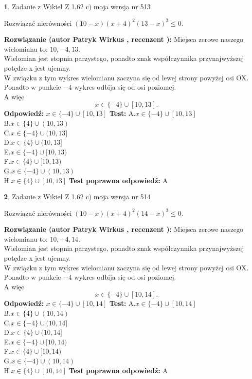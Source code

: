 \documentclass[12pt, a4paper]{article}
\theoremstyle{definition} %
\newtheorem{zad}{}
\newcommand{\zadStart}[1]{\begin{zad}#1\newline}
\newcommand{\zadStop}{\end{zad}}
\newcommand{\rozwStart}[2]{\noindent \textbf{Rozwiązanie (autor #1 , recenzent #2): }\newline}
\newcommand{\rozwStop}{\newline}
\newcommand{\odpStart}{\noindent \textbf{Odpowiedź:}\newline}
\newcommand{\odpStop}{\newline}
\newcommand{\testStart}{\noindent \textbf{Test:}\newline}
\newcommand{\testStop}{\newline}
\newcommand{\kluczStart}{\noindent \textbf{Test poprawna odpowiedź:}\newline}
\newcommand{\kluczStop}{\newline}
\begin{document}
\zadStart{Zadanie z Wikieł Z 1.62 c) moja wersja nr 513}

Rozwiązać nierówności $(10-x)(x+4)^{2}(13-x)^{3}\le0$.
\zadStop
\rozwStart{Patryk Wirkus}{}
Miejsca zerowe naszego wielomianu to: $10, -4, 13$.\\
Wielomian jest stopnia parzystego, ponadto znak współczynnika przy\linebreak najwyższej potędze x jest ujemny.\\ W związku z tym wykres wielomianu zaczyna się od lewej strony powyżej osi OX.\\
Ponadto w punkcie $-4$ wykres odbija się od osi poziomej.\\
A więc $$x \in \{-4\} \cup [10,13].$$
\rozwStop
\odpStart
$x \in \{-4\} \cup [10,13]$
\odpStop
\testStart
A.$x \in \{-4\} \cup [10,13]$\\
B.$x \in \{4\} \cup (10,13)$\\
C.$x \in \{-4\} \cup (10,13]$\\
D.$x \in \{4\} \cup (10,13]$\\
E.$x \in \{-4\} \cup [10,13)$\\
F.$x \in \{4\} \cup [10,13)$\\
G.$x \in \{-4\} \cup (10,13)$\\
H.$x \in \{4\} \cup [10,13]$
\testStop
\kluczStart
A
\kluczStop



\zadStart{Zadanie z Wikieł Z 1.62 c) moja wersja nr 514}

Rozwiązać nierówności $(10-x)(x+4)^{2}(14-x)^{3}\le0$.
\zadStop
\rozwStart{Patryk Wirkus}{}
Miejsca zerowe naszego wielomianu to: $10, -4, 14$.\\
Wielomian jest stopnia parzystego, ponadto znak współczynnika przy\linebreak najwyższej potędze x jest ujemny.\\ W związku z tym wykres wielomianu zaczyna się od lewej strony powyżej osi OX.\\
Ponadto w punkcie $-4$ wykres odbija się od osi poziomej.\\
A więc $$x \in \{-4\} \cup [10,14].$$
\rozwStop
\odpStart
$x \in \{-4\} \cup [10,14]$
\odpStop
\testStart
A.$x \in \{-4\} \cup [10,14]$\\
B.$x \in \{4\} \cup (10,14)$\\
C.$x \in \{-4\} \cup (10,14]$\\
D.$x \in \{4\} \cup (10,14]$\\
E.$x \in \{-4\} \cup [10,14)$\\
F.$x \in \{4\} \cup [10,14)$\\
G.$x \in \{-4\} \cup (10,14)$\\
H.$x \in \{4\} \cup [10,14]$
\testStop
\kluczStart
A
\kluczStop
\end{document}
